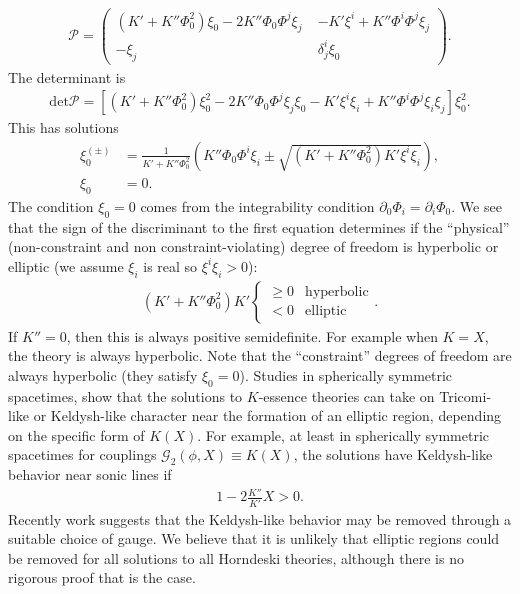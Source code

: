 \documentclass{ws-ijmpd}
\begin{document}
\begin{align}
   \mathcal{P}
   =
   \begin{pmatrix}
      \left(
         K' 
         +
         K'' \Phi_0^2
      \right)
      \xi_0
      -
      2K'' \Phi_0\Phi^j\xi_j
      \;
      & 
      -
      K'\xi^i
      +
      K'' \Phi^i\Phi^j\xi_j
      \\
      -
      \xi_j
      &
      \delta^i_j\xi_0
   \end{pmatrix}
   .
\end{align}
The determinant is
\begin{align}
   \mathrm{det}\mathcal{P}
   =
   \left[
      \left(
         K' 
         +
         K'' \Phi_0^2
      \right)
      \xi_0^2
      -
      2K'' \Phi_0\Phi^j\xi_j \xi_0
      -
      K'\xi^i\xi_i
      +
      K'' \Phi^i\Phi^j\xi_i\xi_j
   \right]
   \xi_0^2
   .
\end{align}
This has solutions
\begin{align}
   \xi^{(\pm)}_0
   &=
   \frac{1}{K' + K''\Phi_0^2}
   \left(
      K'' \Phi_0\Phi^i\xi_i
      \pm
      \sqrt{
         \left(K' + K''\Phi_0^2\right)
         K'\xi^i\xi_i
      }
   \right)
   ,\\
   \xi_0
   &=
   0
   .
\end{align}
The condition $\xi_0=0$ comes from the integrability condition
$\partial_0\Phi_i=\partial_i\Phi_0$.
We see that the sign of the discriminant to the first equation
determines if the ``physical'' 
(non-constraint and non constraint-violating)
degree of freedom is hyperbolic or elliptic
(we assume $\xi_i$ is real so $\xi^i\xi_i>0$):
\begin{align}
\label{eq:discriminant_k_essence}
   \left(K' + K''\Phi_0^2\right)
   K'
   \begin{cases}
      \geq
      0
      & 
      \mathrm{hyperbolic}
      \\
      <
      0
      &
      \mathrm{elliptic}
   \end{cases}
   .
\end{align}
If $K''=0$, then this is always positive semidefinite. For example
when $K=X$, the theory is always hyperbolic.
Note that the ``constraint'' degrees of freedom are always
hyperbolic (they satisfy $\xi_0=0$).
Studies in spherically symmetric spacetimes,
show that the solutions to $K$-essence theories can take on
Tricomi-like or Keldysh-like character near the formation of
an elliptic region, depending on the specific form of 
$K(X)$\cite{Bernard:2019fjb,Bezares:2020wkn,Lara:2021piy}.
For example, at least in spherically symmetric spacetimes
for couplings $\mathcal{G}_2\left(\phi,X\right)\equiv K\left(X\right)$,
the solutions have Keldysh-like behavior
near sonic lines if\cite{Bezares:2020wkn}
\begin{align}
   1 - 2\frac{K''}{K'}X > 0
   .
\end{align}
Recently work suggests that the
Keldysh-like behavior may be removed through a suitable choice
of gauge\cite{Bezares:2021dma}.
We believe that it is unlikely that elliptic regions 
could be removed for all solutions to all Horndeski theories, 
although there is no rigorous proof that is the case.
\end{document}
